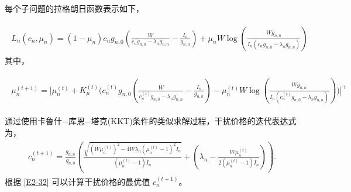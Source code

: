 每个子问题的拉格朗日函数表示如下，

\begin{eqnarray}\label{E2-30}
\begin{array}{lll}
\!\!\!\!\textit{L}_n(c_n, \mu_n)=(1-\mu_n)c_{n} g_{n,0}\left(\frac{W}{c_n g_{n,0}-\lambda_n g_{n,n}}-\frac{I_n}{g_{n,n}}\right)
+\mu_n W \log\left(\frac{W g_{n,n}}{I_n (c_n g_{n,0}-\lambda_n g_{n,n}) }\right)
\end{array}
\end{eqnarray}
其中，

\begin{eqnarray}\label{E2-31}
\begin{array}{lll}
\!\!\!\mu_n^{(t+1)}=\Big[\mu_n^{(t)}\!\!+\!K_{\mu}^{(t)}\big(c_{n}^{(t)} g_{n,0}(\frac{W}{c_n^{(t)} g_{n,0}-\lambda_n g_{n,n}}-\frac{I_n}{g_{n,n}})-\mu_n^{(t)} W \log(\frac{W g_{n,n}}{I_n (c_n^{(t)} g_{n,0}-\lambda_n g_{n,n}) })\big)\Big]^+
\end{array}
\end{eqnarray}

通过使用卡鲁什$-$库恩$-$塔克(KKT)条件的类似求解过程，干扰价格的迭代表达式为，
\begin{eqnarray}\label{E2-32}
 \begin{array}{lll}
\!\!\!\!c_n^{(t+1)}\!\!\!=\!\!\frac{g_{n,n}}{g_{n,0}}\!\!\left(\!\!\frac{ \sqrt{(W\mu_n^{(t)})^{2}\!-4W\lambda_n(\mu_n^{(t)}\!\!-\!1)^2I_n}}{(\mu_n^{(t)}-1)I_n}\!\!+\!\! (\lambda_n\!\!\!-\!\!\frac{W\mu_n^{(t)}}{2(\mu_n^{(t)}\!\!-\!1)I_n})\!\!\right).\!\!\!\!
\end{array}
\end{eqnarray}
根据 \eqref{E2-32} 可以计算干扰价格的最优值 $c_{n}^{(t+1)}$。

